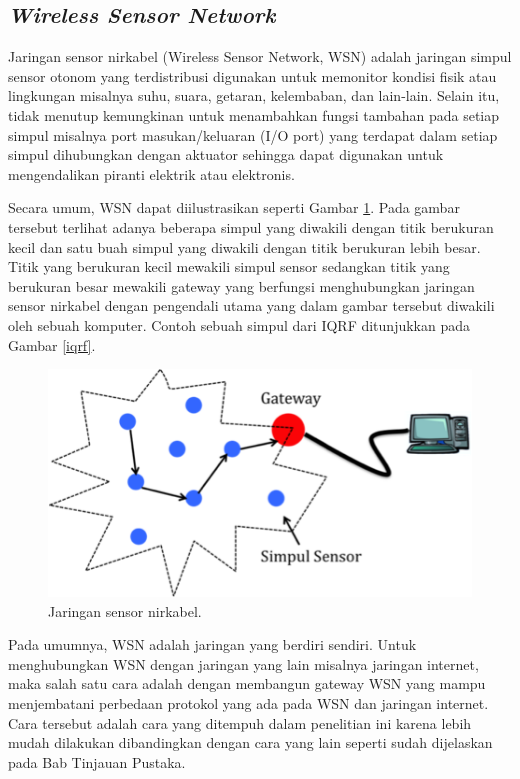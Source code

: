   \subsection{\emph{Wireless Sensor Network}}
    Jaringan sensor nirkabel (Wireless Sensor Network, WSN) adalah jaringan simpul sensor otonom yang terdistribusi digunakan untuk memonitor kondisi fisik atau lingkungan misalnya suhu, suara, getaran, kelembaban, dan lain-lain. Selain itu, tidak menutup kemungkinan untuk menambahkan fungsi tambahan pada setiap simpul misalnya port masukan/keluaran (I/O port) yang terdapat dalam setiap simpul dihubungkan dengan aktuator sehingga dapat digunakan untuk mengendalikan piranti elektrik atau elektronis.

    Secara umum, WSN dapat diilustrasikan seperti Gambar \ref{wsn}. Pada gambar tersebut terlihat adanya beberapa simpul yang diwakili dengan titik berukuran kecil dan satu buah simpul yang diwakili dengan titik berukuran lebih besar. Titik yang berukuran kecil mewakili simpul sensor sedangkan titik yang berukuran besar mewakili gateway yang berfungsi menghubungkan jaringan sensor nirkabel dengan pengendali utama yang dalam gambar tersebut diwakili oleh sebuah komputer. Contoh sebuah simpul dari IQRF ditunjukkan pada Gambar \ref{iqrf}.

      \begin{figure}[ht!]
        \centering
          \includegraphics{gambar/wsn}
          \caption{Jaringan sensor nirkabel.}
          \label{wsn}
      \end{figure}

    Pada umumnya, WSN adalah jaringan yang berdiri sendiri. Untuk menghubungkan WSN dengan jaringan yang lain misalnya jaringan internet, maka salah satu cara adalah dengan membangun gateway WSN yang mampu menjembatani perbedaan protokol yang ada pada WSN dan jaringan internet. Cara tersebut adalah cara yang ditempuh dalam penelitian ini karena lebih mudah dilakukan dibandingkan dengan cara yang lain seperti sudah dijelaskan pada Bab Tinjauan Pustaka.

